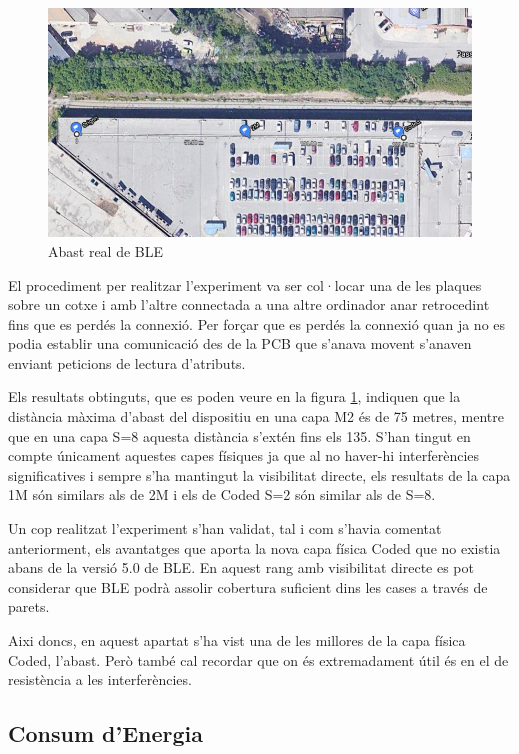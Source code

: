 \begin{figure}[!h]
	\begin{center}
		\includegraphics[width=\textwidth]{./images/prova_abast.png}
		\caption{Abast real de BLE}
		\label{abast}
	\end{center}
\end{figure}

El procediment per realitzar l'experiment va ser col·locar una de les plaques sobre un cotxe i amb l'altre connectada a una altre ordinador anar retrocedint fins que es perdés la connexió.
Per forçar que es perdés la connexió quan ja no es podia establir una comunicació des de la PCB que s'anava movent s'anaven enviant peticions de lectura d'atributs.

Els resultats obtinguts, que es poden veure en la figura \ref{abast}, indiquen que la distància màxima d'abast del dispositiu en una capa M2 és de 75 metres, mentre que en una capa S=8 aquesta distància s'extén fins els 135.
S'han tingut en compte únicament aquestes capes físiques ja que al no haver-hi interferències significatives i sempre s'ha mantingut la visibilitat directe, els resultats de la capa 1M són similars als de 2M i els de Coded S=2 són similar als de S=8.

Un cop realitzat l'experiment s'han validat, tal i com s'havia comentat anteriorment, els avantatges que aporta la nova capa física Coded que no existia abans de la versió 5.0 de BLE.
En aquest rang amb visibilitat directe es pot considerar que BLE podrà assolir cobertura suficient dins les cases a través de parets.

Aixi doncs, en aquest apartat s'ha vist una de les millores de la capa física Coded, l'abast.
Però també cal recordar que on és extremadament útil és en el de resistència a les interferències.

\subsection{Consum d'Energia}

